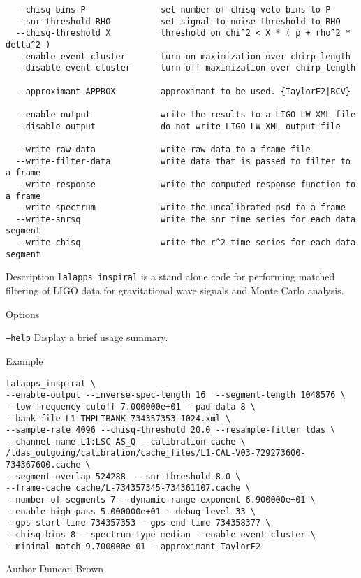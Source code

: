 \begin{entry}
\begin{verbatim}
  --chisq-bins P               set number of chisq veto bins to P
  --snr-threshold RHO          set signal-to-noise threshold to RHO
  --chisq-threshold X          threshold on chi^2 < X * ( p + rho^2 * delta^2 )
  --enable-event-cluster       turn on maximization over chirp length
  --disable-event-cluster      turn off maximization over chirp length

  --approximant APPROX         approximant to be used. {TaylorF2|BCV}

  --enable-output              write the results to a LIGO LW XML file
  --disable-output             do not write LIGO LW XML output file

  --write-raw-data             write raw data to a frame file
  --write-filter-data          write data that is passed to filter to a frame
  --write-response             write the computed response function to a frame
  --write-spectrum             write the uncalibrated psd to a frame
  --write-snrsq                write the snr time series for each data segment
  --write-chisq                write the r^2 time series for each data segment
\end{verbatim}

\item[Description] 
\verb$lalapps_inspiral$ is a stand alone code for performing matched filtering
of LIGO data for gravitational wave signals and Monte Carlo analysis.

\item[Options]\leavevmode
\begin{entry}
\item[\texttt{--help}] Display a brief usage summary.
\end{entry}

\item[Example]
\begin{verbatim}
lalapps_inspiral \
--enable-output --inverse-spec-length 16  --segment-length 1048576 \
--low-frequency-cutoff 7.000000e+01 --pad-data 8 \
--bank-file L1-TMPLTBANK-734357353-1024.xml \
--sample-rate 4096 --chisq-threshold 20.0 --resample-filter ldas \
--channel-name L1:LSC-AS_Q --calibration-cache \
/ldas_outgoing/calibration/cache_files/L1-CAL-V03-729273600-734367600.cache \
--segment-overlap 524288  --snr-threshold 8.0 \
--frame-cache cache/L-734357345-734361107.cache \
--number-of-segments 7 --dynamic-range-exponent 6.900000e+01 \
--enable-high-pass 5.000000e+01 --debug-level 33 \
--gps-start-time 734357353 --gps-end-time 734358377 \
--chisq-bins 8 --spectrum-type median --enable-event-cluster \
--minimal-match 9.700000e-01 --approximant TaylorF2
\end{verbatim}

\item[Author] 
Duncan Brown
\end{entry}
\clearpage

